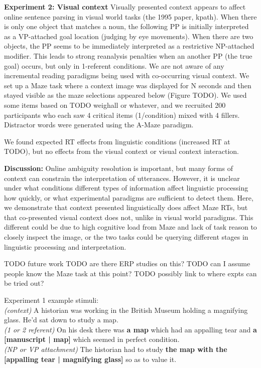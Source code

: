 \documentclass[11pt,a4paper]{article}
\begin{document}
\medskip
\noindent\textbf{Experiment 2: Visual context} Visually presented context appears to affect online sentence parsing in visual world tasks (the 1995 paper, kpath). When there is only one object that matches a noun, the following PP is initially interpreted as a VP-attached goal location (judging by eye movements). When there are two objects, the PP seems to be immediately interpreted as a restrictive NP-attached modifier. This leads to strong reanalysis penalties when an another PP (the true goal) occurs, but only in 1-referent conditions. We are not aware of any incremental reading paradigms being used with co-occurring visual context. We set up a Maze task where a context image was displayed for N seconds and then stayed visible as the maze selections appeared below (Figure TODO). We used some items based on TODO weighall or whatever, and we recruited 200 participants who each saw 4 critical items (1/condition) mixed with 4 fillers. Distractor words were generated using the A-Maze paradigm. 

We found expected RT effects from linguistic conditions (increased RT at TODO), but no effects from the visual context or visual context interaction. 

\medskip
\noindent\textbf{Discussion:} Online ambiguity resolution is important, but many forms of context can constrain the interpretation of utterances. However, it is unclear under what conditions different types of information affect linguistic processing how quickly, or what experimental paradigms are sufficient to detect them. Here, we demonstrate that context presented linguistically does affect Maze RTs, but that co-presented visual context does not, unlike in visual world paradigms. This different could be due to high cognitive load from Maze and lack of task reason to closely inspect the image, or the two tasks could be querying different stages in linguistic processing and interpretation. 

TODO future work 
TODO are there ERP studies on this? 
TODO can I assume people know the Maze task at this point? 
TODO possibly link to where expts can be tried out? 

\newpage

\begin{minipage}{\textwidth}
\begin{small}
Experiment 1 example stimuli:\\
\textit{(context)} A historian was working in the British Museum holding a magnifying glass. He'd sat down to study  a map. \\
\textit{(1 or 2 referent)} On his desk there was \textbf{a map} which had an appalling tear and \textbf{a  {[manuscript | map]}} which seemed in perfect condition. \\
\textit{(NP or VP attachment)} The historian had to study \textbf{the map with the {[appalling  tear | magnifying glass]}} so as to value it.
\end{small} 
\end{minipage}
\end{document}
